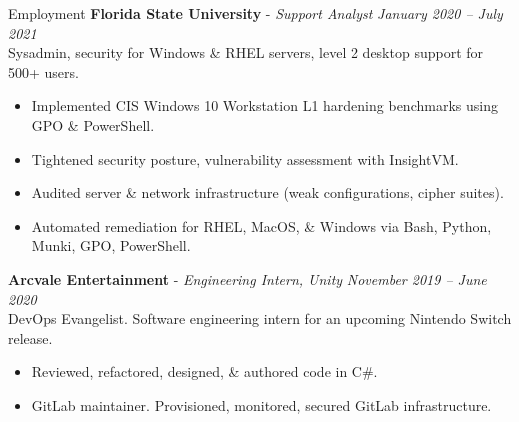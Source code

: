 \documentclass{resume} %
\begin{document}
{\begin{rSection}{Employment}
		{\bf Florida State University} - {\em Support Analyst} \hfill {\em January 2020 – July 2021} \\
		Sysadmin, security for Windows \& RHEL servers, level 2 desktop support for 500+ users.
		\begin{itemize}
			\vspace{-0.2cm} \item Implemented CIS Windows 10 Workstation L1 hardening benchmarks using GPO \& PowerShell.
			\vspace{-0.2cm} \item Tightened security posture, vulnerability assessment with InsightVM.
			\vspace{-0.2cm} \item Audited server \& network infrastructure (weak configurations, cipher suites).
			\vspace{-0.2cm} \item Automated remediation for RHEL, MacOS, \& Windows via Bash, Python, Munki, GPO, PowerShell.
		\end{itemize}
		{\bf Arcvale Entertainment} - {\em Engineering Intern, Unity} \hfill {\em November 2019 – June 2020}\\
		DevOps Evangelist. Software engineering intern for an upcoming Nintendo Switch release.
		\begin{itemize}
			\vspace{-0.2cm} \item Reviewed, refactored, designed, \& authored code in C\#.
			\vspace{-0.2cm} \item GitLab maintainer. Provisioned, monitored, secured GitLab infrastructure.

\end{itemize}
\end{rSection}}
\end{document}

